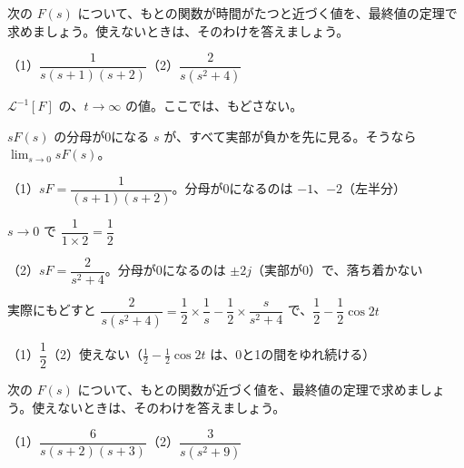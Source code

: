 \begin{reidai}[最後の値だけ求める]
次の $F(s)$ について、もとの関数が時間がたつと近づく値を、最終値の定理で求めましょう。使えないときは、そのわけを答えましょう。\par
（1）\nobreak $\dfrac{1}{s(s+1)(s+2)}$\qquad（2）\nobreak $\dfrac{2}{s(s^2+4)}$\par
\kangaekata {}\par
{}\enspace $\mathcal L^{-1}[F]$ の、$t\to\infty$ の値。ここでは、もどさない。\par
{}\enspace $sF(s)$ の分母が0になる $s$ が、すべて実部が負かを先に見る。そうなら $\displaystyle\lim_{s\to0}sF(s)$。\par
\shiki\kixhs{}\zw{} （1）$sF=\dfrac{1}{(s+1)(s+2)}$。分母が0になるのは $-1$、$-2$（左半分）\par
\kixhb $s\to0$ で $\dfrac{1}{1\times2}=\dfrac12$\par
\kixha （2）$sF=\dfrac{2}{s^2+4}$。分母が0になるのは $\pm2j$（実部が0）で、落ち着かない\par
\kixhb 実際にもどすと $\dfrac{2}{s(s^2+4)}=\dfrac{1}{2}\times\dfrac1s-\dfrac12\times\dfrac{s}{s^2+4}$ で、$\dfrac12-\dfrac12\cos2t$\par
\kotae （1）\nobreak $\dfrac12$\quad（2）\nobreak 使えない（$\frac12-\frac12\cos2t$ は、0と1の間をゆれ続ける）
\end{reidai}

\begin{jibun}
次の $F(s)$ について、もとの関数が近づく値を、最終値の定理で求めましょう。使えないときは、そのわけを答えましょう。\par
（1）\nobreak $\dfrac{6}{s(s+2)(s+3)}$\qquad（2）\nobreak $\dfrac{3}{s(s^2+9)}$
\end{jibun}

